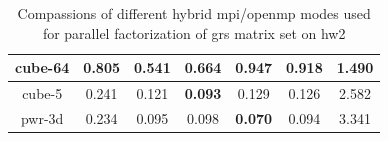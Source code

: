 \begin{table}[h!]
\begin{tabular}{|c|c|c|c|c|c|c|}
cube-64                                               & 0.805                                                     & \textbf{0.541}                                             & 0.664                                                     & 0.947                                                      & 0.918                                                      & 1.490                                                            \\ \hline
cube-5                                                & 0.241                                                     & 0.121                                                      & \textbf{0.093}                                            & 0.129                                                      & 0.126                                                      & 2.582                                                            \\ \hline
pwr-3d                                                & 0.234                                                     & 0.095                                                      & 0.098                                                     & \textbf{0.070}                                             & 0.094                                                      & 3.341                                                            \\ \hline
\end{tabular}
\caption{Compassions of different hybrid \acrshort{mpi}/\acrshort{openmp} modes used for parallel factorization of \acrshort{grs} matrix set on \gls{hw2}}
\label{fig:mpi-omp-grs-hw2}
\end{table}


